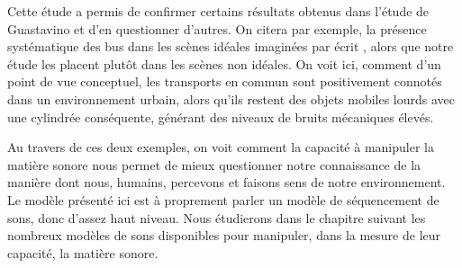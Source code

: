   Cette étude a permis de confirmer certains résultats obtenus dans l'étude de Guastavino\cite{guastavino2006ideal} et d'en questionner d'autres. On citera par exemple, la présence systématique des bus dans les scènes idéales imaginées \og par écrit \fg, alors que notre étude les placent plutôt dans les scènes non idéales. On voit ici, comment d'un point de vue conceptuel, les transports en commun sont positivement connotés dans un environnement urbain, alors qu'ils restent des objets mobiles lourds avec une cylindrée conséquente, générant des niveaux de bruits mécaniques élevés\cite{lafayhal-01300399}.

  Au travers de ces deux exemples, on voit comment la capacité à manipuler la matière sonore nous permet de mieux questionner notre connaissance de la manière dont nous, humains, percevons et faisons sens de notre environnement. Le modèle présenté ici est à proprement parler un modèle de séquencement de sons, donc d'assez haut niveau. Nous étudierons dans le chapitre suivant les nombreux modèles de sons disponibles pour manipuler, dans la mesure de leur capacité, la matière sonore. %


